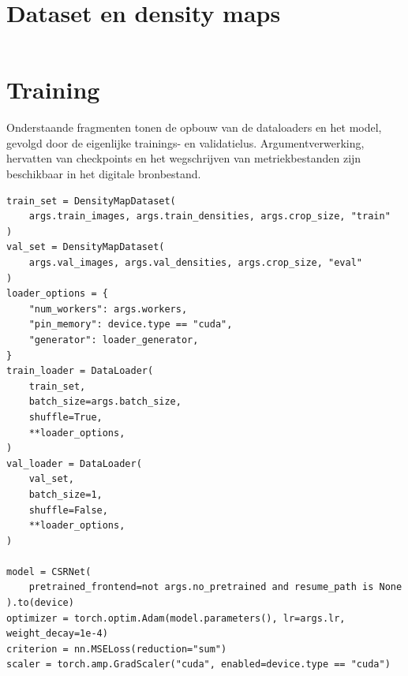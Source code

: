 \section{Dataset en density maps}
\inputminted[fontsize=\scriptsize]{python}{../crowd_counting/data.py}

\clearpage
\section{Training}
Onderstaande fragmenten tonen de opbouw van de dataloaders en het model, gevolgd door de eigenlijke trainings- en validatielus. Argumentverwerking, hervatten van checkpoints en het wegschrijven van metriekbestanden zijn beschikbaar in het digitale bronbestand.
\begin{verbatim}
train_set = DensityMapDataset(
    args.train_images, args.train_densities, args.crop_size, "train"
)
val_set = DensityMapDataset(
    args.val_images, args.val_densities, args.crop_size, "eval"
)
loader_options = {
    "num_workers": args.workers,
    "pin_memory": device.type == "cuda",
    "generator": loader_generator,
}
train_loader = DataLoader(
    train_set,
    batch_size=args.batch_size,
    shuffle=True,
    **loader_options,
)
val_loader = DataLoader(
    val_set,
    batch_size=1,
    shuffle=False,
    **loader_options,
)

model = CSRNet(
    pretrained_frontend=not args.no_pretrained and resume_path is None
).to(device)
optimizer = torch.optim.Adam(model.parameters(), lr=args.lr, weight_decay=1e-4)
criterion = nn.MSELoss(reduction="sum")
scaler = torch.amp.GradScaler("cuda", enabled=device.type == "cuda")
\end{verbatim}

